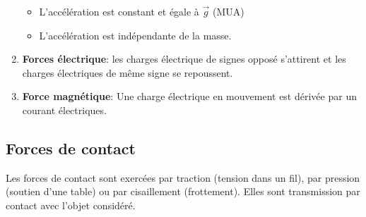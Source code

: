 \documentclass[
    11pt,
    a4paper,
    oneside,
    headinlcude, footinclude,
    twoside,
]{report}
\renewcommand{\vec}[1]{\overrightarrow{#1}}
\begin{document}
\begin{enumerate}
        \begin{itemize}
            \item L'accélération est constant et égale à $\vec g$ (MUA)
            \item L'accélération est indépendante de la masse.
        \end{itemize}

    \item \textbf{Forces électrique}: les charges électrique de signes opposé
        s'attirent et les charges électriques de même signe se repoussent.

    \item \textbf{Force magnétique}: Une charge électrique en mouvement est
        dérivée par un courant électriques.
\end{enumerate}

\subsection{Forces de contact}
\label{sub:forces_de_contact}

Les forces de contact sont exercées par traction (tension dans un fil), par
pression (soutien d'une table) ou par cisaillement (frottement). Elles sont
transmission par contact avec l'objet considéré.
\end{document}
